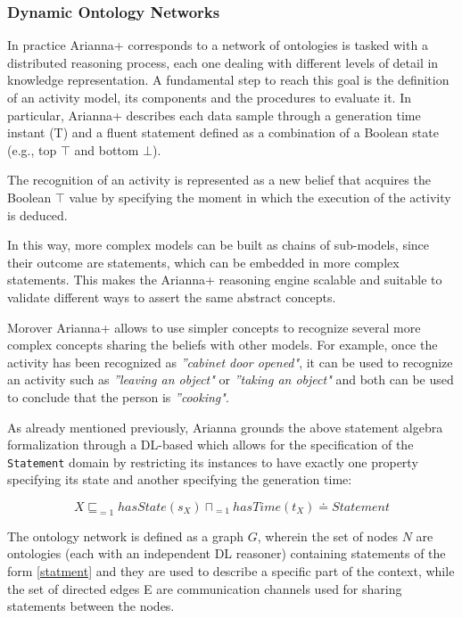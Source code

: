 \documentclass{thesisreport}
\begin{document}
 \subsubsection{Dynamic Ontology Networks}
 In practice Arianna+ corresponds to a network of ontologies is tasked with a distributed reasoning process, each one dealing with different levels of detail in knowledge representation. 
 A fundamental step to reach this goal is  the definition of an activity model, its components and the procedures to evaluate it. In particular, Arianna+ describes each data sample through a generation time instant (T) and a fluent statement defined as a combination of a Boolean state (e.g., top $\top$ and bottom $\bot$).
 
 The recognition of an activity is represented as a new belief that acquires the Boolean $\top$ value by specifying the moment in which the execution of the activity is deduced.
 
 In this way, more complex models can be built as chains of sub-models, since their outcome are statements, which can be embedded in more complex statements.
 This makes the Arianna+ reasoning engine scalable and suitable to validate different ways to assert the same abstract concepts.
 
Morover Arianna+ allows to use simpler concepts to recognize several more complex concepts sharing the beliefs  with other models. For example, once the activity has been recognized as \textit{''cabinet door opened"}, it can be used to recognize an activity such as \textit{''leaving an object"} or \textit{''taking an object"} and both can be used to conclude that the person is \textit{''cooking"}.

 As already mentioned previously, Arianna grounds the above statement algebra formalization through a DL-based which allows for the specification of the \texttt{Statement} domain by restricting its instances to have exactly one property specifying its state and another specifying the generation time:
 
 \begin{equation}
     X \sqsubseteq_{=1} hasState(s_X) \sqcap_{=1} hasTime(t_X) \doteq Statement
     \label{statment}
 \end{equation}
 
 The ontology network is defined as a graph $G$, wherein the set of nodes $N$ are ontologies (each with an independent DL reasoner) containing statements of the form \ref{statment} and they are used to describe a specific part of the context, while the set of directed edges E are communication channels used for sharing statements between the nodes.
 
\end{document}
